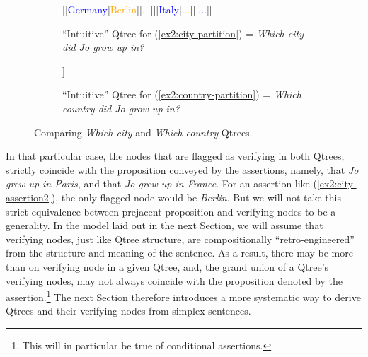 \begin{figure}[H]
	\centering
	\begin{subfigure}[t]{.45\linewidth}
		\centering
		\begin{forest}
			[{CS\\
				Jo grew up in...}[\textcolor{blue}{France}[\textcolor{orange}{{\fbox{Paris}}}][\textcolor{orange}{Lyon}][\textcolor{orange}{...}]][\textcolor{blue}{Germany}[\textcolor{orange}{Berlin}][\textcolor{orange}{...}]][\textcolor{blue}{Italy}[\textcolor{orange}{...}]][\textcolor{blue}{...}]]
		\end{forest}
		\caption{``Intuitive'' Qtree for (\ref{ex2:city-partition}) = \textit{Which city did Jo grow up in?}}\label{fig2:paris-qtree}
	\end{subfigure}\hfill
	\begin{subfigure}[t]{.45\linewidth}
		\centering
		\begin{forest}
			[{CS\\
				Jo grew up in...}[\textcolor{blue}{\fbox{France}}][\textcolor{blue}{Germany}][\textcolor{blue}{Italy}][\textcolor{blue}{...}]]
		\end{forest}
		\caption{``Intuitive'' Qtree for (\ref{ex2:country-partition}) = \textit{Which country did Jo grow up in?}}\label{fig2:france-qtree}
	\end{subfigure}
	\caption{Comparing \textit{Which city} and \textit{Which country} Qtrees.}\label{fig2:paris-france-qtrees}
\end{figure}

In that particular case, the nodes that are flagged as verifying in both Qtrees, strictly coincide with the proposition conveyed by the assertions, namely, that \textit{Jo grew up in Paris}, and that \textit{Jo grew up in France}. For an assertion like (\ref{ex2:city-assertion2}), the only flagged node would be \textit{Berlin}. But we will not take this strict equivalence between prejacent proposition and verifying nodes to be a generality. In the model laid out in the next Section, we will assume that verifying nodes, just like Qtree structure, are compositionally ``retro-engineered'' from the structure and meaning of the sentence. As a result, there may be more than on verifying node in a given Qtree, and, the grand union of a Qtree's verifying nodes, may not always coincide with the proposition denoted by the assertion.\footnote{This will in particular be true of conditional assertions.}
The next Section therefore introduces a more systematic way to derive Qtrees and their verifying nodes from simplex sentences.


